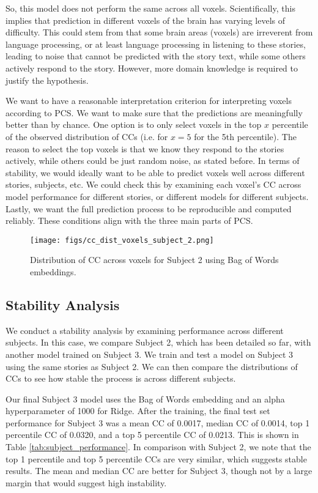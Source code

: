 \documentclass[10pt,letterpaper]{article}
\begin{document}
So, this model does not perform the same across all voxels. Scientifically, this implies that prediction in different voxels of the brain has varying levels of difficulty. This could stem from that some brain areas (voxels) are irreverent from language processing, or at least language processing in listening to these stories, leading to noise that cannot be predicted with the story text, while some others actively respond to the story. However, more domain knowledge is required to justify the hypothesis.

We want to have a reasonable interpretation criterion for interpreting voxels according to PCS. We want to make sure that the predictions are meaningfully better than by chance. One option is to only select voxels in the top \(x\) percentile of the observed distribution of CCs (i.e. for \(x=5\) for the 5th percentile). The reason to select the top voxels is that we know they respond to the stories actively, while others could be just random noise, as stated before. In terms of stability, we would ideally want to be able to predict voxels well across different stories, subjects, etc. We could check this by examining each voxel's CC across model performance for different stories, or different models for different subjects. Lastly, we want the full prediction process to be reproducible and computed reliably. These conditions align with the three main parts of PCS.


\begin{figure}
    \centering
    \texttt{[image: figs/cc\_dist\_voxels\_subject\_2.png]}
    \caption{Distribution of CC across voxels for Subject 2 using Bag of Words embeddings.}
    \label{fig:cc_dist_voxels_subject_2}
\end{figure}


\subsection{Stability Analysis}
We conduct a stability analysis by examining performance across different subjects. In this case, we compare Subject 2, which has been detailed so far, with another model trained on Subject 3. We train and test a model on Subject 3 using the same stories as Subject 2. We can then compare the distributions of CCs to see how stable the process is across different subjects.

Our final Subject 3 model uses the Bag of Words embedding and an alpha hyperparameter of 1000 for Ridge. After the training, the final test set performance for Subject 3 was a mean CC of 0.0017, median CC of 0.0014, top 1 percentile CC of 0.0320, and a top 5 percentile CC of 0.0213. This is shown in Table \ref{tab:subject_performance}. In comparison with Subject 2, we note that the top 1 percentile and top 5 percentile CCs are very similar, which suggests stable results. The mean and median CC are better for Subject 3, though not by a large margin that would suggest high instability.
\end{document}
